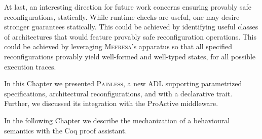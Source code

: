   
	At last, an interesting direction for future work concerns ensuring provably safe
	reconfigurations, statically. While runtime checks are useful, one may
	desire stronger guarantees statically. This could be achieved by
	identifying useful classes of architectures that would feature
	provably safe reconfiguration operations. This could be achieved
	by leveraging \textsc{Mefresa}'s apparatus so that all specified reconfigurations provably
	yield well-formed and well-typed states, for all 
	possible execution traces.





\chapbreak

	In this Chapter we presented \textsc{Painless}, a new \ac{ADL} supporting parametrized specifications,
	architectural reconfigurations, and with a declarative trait. Further, we discussed its integration with
	the ProActive middleware.
		
		In the following Chapter we describe the mechanization of a behavioural semantics with the
		Coq proof assistant.
	
	
	
	
	
